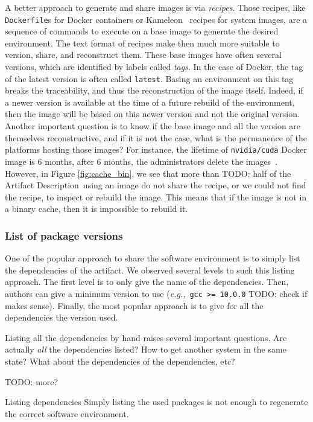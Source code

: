 \documentclass[sigconf]{acmart}
\newcommand{\eg}{\emph{e.g.,}}
\newcommand{\ad}{Artifact Description}
\newcommand{\todo}[1]{{\color{red}TODO: #1}}
\begin{document}
A better approach to generate and share images is via \emph{recipes}.
Those recipes, like \texttt{Dockerfile}s for Docker containers or Kameleon\ \cite{ruiz_reconstructable_2015} recipes for system images, are a sequence of commands to execute on a base image to generate the desired environment.
The text format of recipes make then much more suitable to version, share, and reconstruct them.
These base images have often several versions, which are identified by labels called \emph{tags}.
In the case of Docker, the tag of the latest version is often called \texttt{latest}.
Basing an environment on this tag breaks the traceability, and thus the reconstruction of the image itself.
Indeed, if a newer version is available at the time of a future rebuild of the environment, then the image will be based on this newer version and not the original version.
Another important question is to know if the base image and all the version are themselves reconstructive, and if it is not the case, what is the permanence of the platforms hosting those images?
For instance, the lifetime of \texttt{nvidia/cuda} Docker image is 6 months, after 6 months, the administrators delete the images\ \cite{nvidia_cuda_lifetime}.
However, in Figure \ref{fig:cache_bin}, we see that more than \todo{half} of the \ad\ using an image do not share the recipe, or we could not find the recipe, to inspect or rebuild the image.
This means that if the image is not in a binary cache, then it is impossible to rebuild it.


\subsubsection{List of package versions}\label{sec:sop:sw:list}

One of the popular approach to share the software environment is to simply list the dependencies of the artifact.
We observed several levels to such this listing approach.
The first level is to only give the name of the dependencies.
Then, authors can give a minimum version to use (\eg\ \texttt{gcc >= 10.0.0} \todo{check if makes sense}).
Finally, the most popular approach is to give for all the dependencies the version used.

Listing all the dependencies by hand raises several important questions.
Are actually \emph{all} the dependencies listed?
How to get another system in the same state?
What about the dependencies of the dependencies, etc?

\todo{more?}

\begin{lesson}{Listing dependencies}{}
  Simply listing the used packages is not enough to regenerate the correct software environment.
\end{lesson}
\end{document}
